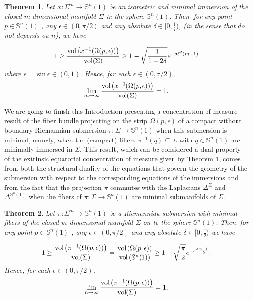 \documentclass[11pt,letterpaper]{amsart}
\newtheorem{theorem}{Theorem}[section]
\theoremstyle{definition}
\theoremstyle{remark}
\newcommand{\ese}{\mathbb{S}}
\begin{document}
\begin{theorem}\label{mainInt}
Let  $x: \Sigma^m \to \mathbb{S}^n(1)$ be an isometric and minimal immersion of the closed $m$-dimensional manifold $\Sigma$ in the sphere  $\mathbb{S}^n(1)$. Then, for any point $p \in \mathbb{S}^n(1)$ , any  $\epsilon \in (0,\pi/2)$ and any  absolute $\delta\in [0,\frac{1}{2})$, (in the sense that do not depends on $n$), we have 

\begin{equation}\label{eq4}
1\geq \frac{{\rm vol}\left(x^{-1}(\Omega(p,\epsilon))\right)}{{\rm vol}(\Sigma)}\geq  1- \sqrt{\frac{1}{1-2\delta}}e^{-\delta\bar\epsilon^2(m+1)}
\end{equation}
where $\bar\epsilon=\sin\epsilon \in (0,1)$. Hence, for each  $\epsilon \in (0,\pi/2)$,
\begin{equation}\label{eq5}
\lim_{m\to\infty}\frac{{\rm vol}\left(x^{-1}(\Omega(p,\epsilon))\right)}{{\rm vol}(\Sigma)}=1.
\end{equation}


\end{theorem}

We are going to finish this Introduction presenting a concentration of measure result of the fiber bundle projecting on the strip $\Omega(p, \epsilon)$ of a compact without boundary Riemannian submersion $\pi: \Sigma \rightarrow \ese^n(1)$ when this submersion is minimal, namely, when the (compact) fibers $\pi^{-1}(q) \subseteq \Sigma$ with $q \in \ese^n(1)$ are minimally immersed in $\Sigma$. This result, which can be considered a dual property of the extrinsic equatorial concentration of measure given by Theorem \ref{mainInt}, comes from both the structural duality of the equations that govern the geometry of the submersion with respect to the corresponding equations of the immersions and from the fact that the projection $\pi$ commutes with the Laplacians $\Delta^\Sigma$ and $\Delta^{\ese^n(1)}$ when the fibers of $\pi: \Sigma \rightarrow \ese^n(1)$ are minimal submanifolds of $\Sigma$.

\begin{theorem}\label{TeoSub}
Let  $\pi: \Sigma^m \to \mathbb{S}^n(1)$ be a Riemannian submersion with minimal fibers  of the closed $m$-dimensional manifold $\Sigma$ on to the sphere  $\mathbb{S}^n(1)$. Then, for any point $p \in \mathbb{S}^n(1)$ , any  $\epsilon \in (0,\pi/2)$ and any absolute $\delta\in [0,\frac{1}{2})$ we have 

\begin{equation}
1\geq \frac{{\rm vol}\left(\pi^{-1}(\Omega(p,\epsilon))\right)}{{\rm vol}(\Sigma)}=\frac{{\rm vol}\left(\Omega(p,\epsilon)\right)}{{\rm vol}\left(\mathbb{S}^n(1)\right)}\geq  1-\sqrt{\frac{\pi}{2}}e^{-\epsilon^2\frac{n-1}{2}}.
\end{equation}
Hence, for each  $\epsilon \in (0,\pi/2)$,
\begin{equation}
\lim_{n\to\infty}\frac{{\rm vol}\left(\pi^{-1}(\Omega(p,\epsilon))\right)}{{\rm vol}(\Sigma)}=1.
\end{equation}
\end{theorem}
\bigskip
\end{document}
